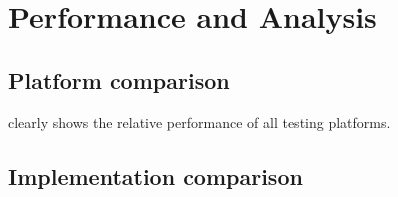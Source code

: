 \chapter{Performance and Analysis}
\renewcommand{\baselinestretch}{\mystretch}
\label{chap:Perf}

\section{Platform comparison}

 clearly shows the relative performance of all testing platforms.

\section{Implementation comparison}

